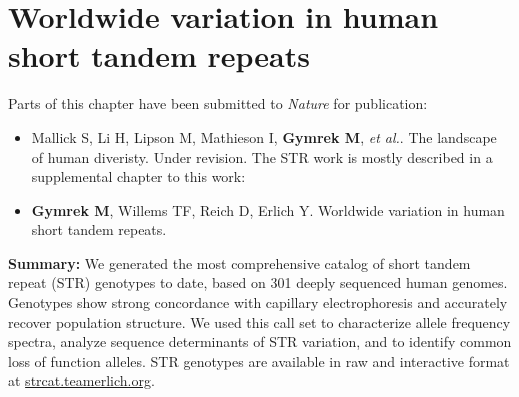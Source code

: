 \chapter{Worldwide variation in human short tandem repeats}

\hzline

Parts of this chapter have been submitted to \emph{Nature} for publication:
\begin{itemize}
\item[] Mallick S, Li H, Lipson M, Mathieson I, \textbf{Gymrek M}, \emph{et al.}. The landscape of human diveristy. Under revision. The STR work is mostly described in a supplemental chapter to this work:
\item[] \textbf{Gymrek M}, Willems TF, Reich D, Erlich Y. Worldwide variation in human short tandem repeats. 
\end{itemize}
\hzline

\textbf{Summary:} We generated the most comprehensive catalog of short tandem repeat (STR) genotypes to date, based on 301 deeply sequenced human genomes. Genotypes show strong concordance with capillary electrophoresis and accurately recover population structure. We used this call set to characterize allele frequency spectra, analyze sequence determinants of STR variation, and to identify common loss of function alleles. STR genotypes are available in raw and interactive format at \url{strcat.teamerlich.org}.

